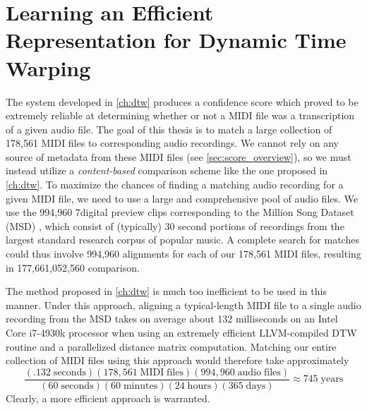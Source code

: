 \chapter{Learning an Efficient Representation for Dynamic Time Warping}
\label{ch:dhs}

The system developed in \cref{ch:dtw} produces a confidence score which proved to be extremely reliable at determining whether or not a MIDI file was a transcription of a given audio file.
The goal of this thesis is to match a large collection of 178,561 MIDI files to corresponding audio recordings.
We cannot rely on any source of metadata from these MIDI files (see \cref{sec:score_overview}), so we must instead utilize a {\em content-based} comparison scheme like the one proposed in \cref{ch:dtw}.
To maximize the chances of finding a matching audio recording for a given MIDI file, we need to use a large and comprehensive pool of audio files.
We use the 994,960 7digital preview clips \cite{schindler2012facilitating} corresponding to the Million Song Dataset (MSD) \cite{bertin2011million}, which consist of (typically) 30 second portions of recordings from the largest standard research corpus of popular music.
A complete search for matches could thus involve 994,960 alignments for each of our 178,561 MIDI files, resulting in 177,661,052,560 comparison.

The method proposed in \cref{ch:dtw} is much too inefficient to be used in this manner.
Under this approach, aligning a typical-length MIDI file to a single audio recording from the MSD takes on average about 132 milliseconds on an Intel Core i7-4930k processor when using an extremely efficient LLVM-compiled DTW routine and a parallelized distance matrix computation.
Matching our entire collection of MIDI files using this approach would therefore take approximately
\begin{equation}
\frac{(.132 \mathrm{\;seconds})(178{,}561 \mathrm{\;MIDI\;files})(994{,}960 \mathrm{\;audio\;files})}{(60 \mathrm{\;seconds})(60 \mathrm{\;minutes})(24 \mathrm{\;hours})(365 \mathrm{\;days})} \approx 745 \mathrm{\;years}
\end{equation}
Clearly, a more efficient approach is warranted.

